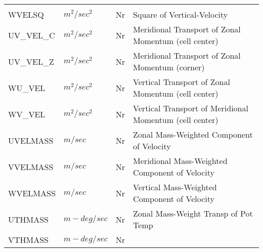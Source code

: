 \begin{tabular}{llll}
\begin{minipage}[t]{3in}
         \end{minipage}\\
 WVELSQ   & $m^2/sec^2$ & Nr
         &\begin{minipage}[t]{3in}
          {Square of Vertical-Velocity} 
         \end{minipage}\\
 UV\_VEL\_C & $m^2/sec^2$ & Nr
         &\begin{minipage}[t]{3in}
          {Meridional Transport of Zonal Momentum (cell center)} 
         \end{minipage}\\
 UV\_VEL\_Z & $m^2/sec^2$ & Nr
         &\begin{minipage}[t]{3in}
          {Meridional Transport of Zonal Momentum (corner)} 
         \end{minipage}\\
 WU\_VEL   & $m^2/sec^2$ & Nr
         &\begin{minipage}[t]{3in}
          {Vertical Transport of Zonal Momentum (cell center)} 
         \end{minipage}\\
 WV\_VEL   & $m^2/sec^2$ & Nr
         &\begin{minipage}[t]{3in}
          {Vertical Transport of Meridional Momentum (cell center)} 
         \end{minipage}\\
 UVELMASS & $m/sec$ & Nr
         &\begin{minipage}[t]{3in}
          {Zonal Mass-Weighted Component of Velocity} 
         \end{minipage}\\
 VVELMASS & $m/sec$ & Nr
         &\begin{minipage}[t]{3in}
          {Meridional Mass-Weighted Component of Velocity} 
         \end{minipage}\\
 WVELMASS & $m/sec$ & Nr
         &\begin{minipage}[t]{3in}
          {Vertical Mass-Weighted Component of Velocity} 
         \end{minipage}\\
 UTHMASS  & $m-deg/sec$ & Nr
         &\begin{minipage}[t]{3in}
          {Zonal Mass-Weight Transp of Pot Temp} 
         \end{minipage}\\
 VTHMASS  & $m-deg/sec$ & Nr
         &\begin{minipage}[t]{3in}

\end{minipage}
\end{tabular}
